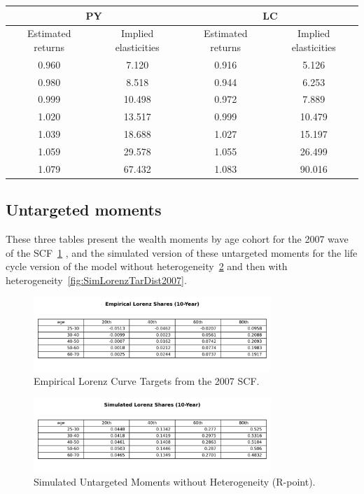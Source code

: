 \begin{center}
\begin{tabular}{|c|c|c|c|}
\hline
\multicolumn{2}{|c|}{PY} & \multicolumn{2}{|c|}{LC} \\
\hline
Estimated returns & Implied elasticities & Estimated returns & Implied elasticities \\
\hline
0.960 & 7.120 & 0.916 & 5.126 \\
0.980 & 8.518 & 0.944 & 6.253 \\
0.999 & 10.498 & 0.972 & 7.889 \\
1.020 & 13.517 & 0.999 & 10.479 \\
1.039 & 18.688 & 1.027 & 15.197 \\
1.059 & 29.578 & 1.055 & 26.499 \\
1.079 & 67.432 & 1.083 & 90.016 \\
\hline
\end{tabular}
\end{center}


\subsection{Untargeted moments}

\par These three tables present the wealth moments by age cohort for the 2007 wave of the SCF~\ref{fig:EmpLorenzTar2007} , and the simulated version of these untargeted moments for the life cycle version of the model without heterogeneity~\ref{fig:SimLorenzTarPoint2007} and then with heterogeneity~\ref{fig:SimLorenzTarDist2007}.

\begin{figure}[h]
\centering
\includegraphics[width=0.8\textwidth]{Tables/Emp_Lorenz_10yr_LCrrDistNetWorth_2007.png}
\caption{Empirical Lorenz Curve Targets from the 2007 SCF.}
\label{fig:EmpLorenzTar2007}
\end{figure}

\begin{figure}[htbp]
\centering
\includegraphics[width=0.8\textwidth]{Tables/Sim_Lorenz_10yr_LCrrPointNetWorth_2007.png}
\caption{Simulated Untargeted Moments without Heterogeneity (R-point).}
\label{fig:SimLorenzTarPoint2007}
\end{figure}

